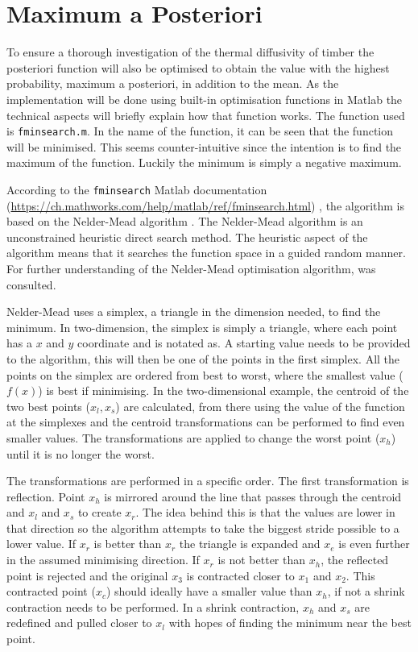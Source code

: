 \section{Maximum a Posteriori}
To ensure a thorough investigation of the thermal diffusivity of timber the posteriori function will also be optimised to obtain the value with the highest probability, maximum a posteriori, in addition to the mean.
As the implementation will be done using built-in optimisation functions in Matlab the technical aspects will briefly explain how that function works.
The function used is \texttt{fminsearch.m}.
In the name of the function, it can be seen that the function will be minimised.
This seems counter-intuitive since the intention is to find the maximum of the function. 
Luckily the minimum is simply a negative maximum. 

According to the \texttt{fminsearch} Matlab documentation (\url{https://ch.mathworks.com/help/matlab/ref/fminsearch.html}) , the algorithm is based on the Nelder-Mead algorithm \citep{Lagarias:1998}.
The Nelder-Mead algorithm is an unconstrained heuristic direct search method.
The heuristic aspect of the algorithm means that it searches the function space in a guided random manner.
For further understanding of the Nelder-Mead optimisation algorithm, \citet{sachin:2016} was consulted.

Nelder-Mead uses a simplex, a triangle in the dimension needed, to find the minimum.
In two-dimension, the simplex is simply a triangle, where each point has a $x$ and $y$ coordinate and is notated as. 
A starting value needs to be provided to the algorithm, this will then be one of the points in the first simplex.
All the points on the simplex are ordered from best to worst, where the smallest value ($f(x)$) is best if minimising.
In the two-dimensional example, the centroid of the two best points ($x_l,x_s$) are calculated, from there using the value of the function at the simplexes and the centroid transformations can be performed to find even smaller values.
The transformations are applied to change the worst point ($x_h$) until it is no longer the worst.

The transformations are performed in a specific order.
The first transformation is reflection.
Point $x_h$ is mirrored around the line that passes through the centroid and $x_l$ and $x_s$ to create $x_r$.
The idea behind this is that the values are lower in that direction so the algorithm attempts to take the biggest stride possible to a lower value.
If $x_r$ is better than $x_r$  the triangle is expanded and $x_e$ is even further in the assumed minimising direction.
If $x_r$ is not better than $x_h$, the reflected point is rejected and the original $x_3$ is contracted closer to $x_1$ and $x_2$.
This contracted point ($x_c$) should ideally have a smaller value than $x_h$, if not a shrink contraction needs to be performed.
In a shrink contraction, $x_h$ and $x_s$ are redefined and pulled closer to $x_l$ with hopes of finding the minimum near the best point.


